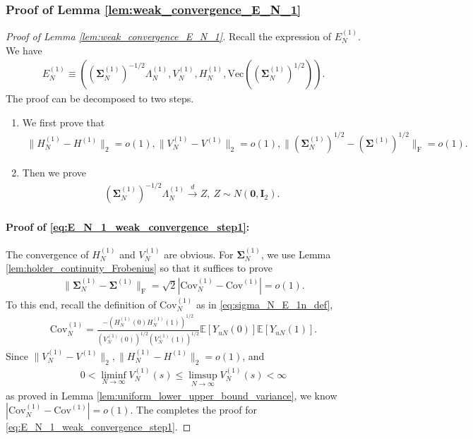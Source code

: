 \documentclass[12pt]{article}
\newcommand{\E}{\mathbb E}								%
\newcommand{\convd}{\overset d \rightarrow}             %
\begin{document}
\subsubsection{Proof of Lemma \ref{lem:weak_convergence_E_N_1}}



\begin{proof}[Proof of Lemma \ref{lem:weak_convergence_E_N_1}]
	Recall the expression of $E_N^{(1)}$. We have 
	\begin{align*}
		E_{N}^{(1)}\equiv \left((\bm \Sigma_N^{(1)})^{-1/2}\Lambda_{N}^{(1)}, V_N^{(1)},H_N^{(1)},\mathrm{Vec}((\bm \Sigma_N^{(1)})^{1/2})\right).
	\end{align*}
	The proof can be decomposed to two steps. 
	\begin{enumerate}
		\item We first prove that  
		\begin{align}\label{eq:E_N_1_weak_convergence_step1}
			\|H_N^{(1)}-H^{(1)}\|_2=o(1),\|V_N^{(1)}-V^{(1)}\|_2=o(1),\|(\bm \Sigma_N^{(1)})^{1/2}-(\bm \Sigma^{(1)})^{1/2}\|_{\mathrm{F}}=o(1).
		\end{align}
		\item Then we prove 
		\begin{align}\label{eq:E_N_1_weak_convergence_step2}
			(\bm \Sigma_N^{(1)})^{-1/2}\Lambda_{N}^{(1)}\convd Z,\ Z\sim N(\bm 0,\bm I_2).
		\end{align}
	\end{enumerate}

	\paragraph{Proof of \eqref{eq:E_N_1_weak_convergence_step1}:}

	The convergence of $H_N^{(1)}$ and $V_N^{(1)}$ are obvious. For $\bm \Sigma_N^{(1)}$, we use Lemma \ref{lem:holder_continuity_Frobenius} so that it suffices to prove 
	\begin{align*}
		\|\bm \Sigma_N^{(1)}-\bm \Sigma^{(1)}\|_{\mathrm{F}}=\sqrt{2}|\mathrm{Cov}_N^{(1)}-\mathrm{Cov}^{(1)}|=o(1).
	\end{align*}
	To this end, recall the definition of $\mathrm{Cov}_N^{(1)}$ as in \eqref{eq:sigma_N_E_1n_def},
	\begin{align*}
		\mathrm{Cov}_N^{(1)}= \frac{-(H_N^{(1)}(0)H_N^{(1)}(1))^{1/2}}{(V_{N}^{(1)}(0))^{1/2}(V_{N}^{(1)}(1))^{1/2}}\E[Y_{uN}(0)]\E[Y_{uN}(1)].
	\end{align*}
	Since $\|V_{N}^{(1)}-V^{(1)}\|_2,\|H_N^{(1)}-H^{(1)}\|_2=o(1)$, and 
	\begin{align*}
		0<\liminf_{N\rightarrow\infty}V_N^{(1)}(s)\leq \limsup_{N\rightarrow\infty}V_N^{(1)}(s)<\infty
	\end{align*}
	as proved in Lemma \ref{lem:uniform_lower_upper_bound_variance}, we know $|\mathrm{Cov}_N^{(1)}-\mathrm{Cov}^{(1)}|=o(1)$. The completes the proof for \eqref{eq:E_N_1_weak_convergence_step1}. 


\end{proof}
\end{document}
